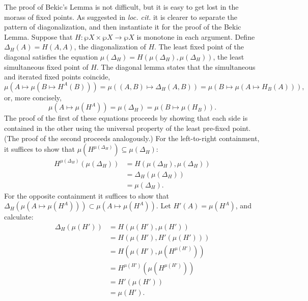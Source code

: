 \documentclass[11pt,twoside]{article}
\begin{document}
The proof of Bekic's Lemma is not difficult, but it is easy to get lost in the morass of
fixed points.  As suggested in \textit{loc. cit.} it is clearer to separate the pattern of
diagonalization, and then instantiate it for the proof of the Bekic Lemma.  Suppose that
$H:\wp{X}\times\wp{X}\to\wp{X}$ is monotone in each argument.  Define
$\Delta_{H}(A)=H(A,A)$, the diagonalization of $H$.  The least fixed point of the diagonal
satisfies the equation $\mu(\Delta_{H})=H(\mu(\Delta_{H}),\mu(\Delta_{H}))$, the least simultaneous fixed point of
$H$.  The diagonal lemma states that the simultaneous and iterated fixed points coincide,
$$\mu(A\mapsto\mu(B\mapsto H^{A}(B)))=\mu((A,B)\mapsto \Delta_{H}(A,B))=\mu(B\mapsto\mu(A\mapsto H_{B}(A))),$$
or, more concisely,
$$\mu(A\mapsto \mu(H^{A}))=\mu(\Delta_{H})=\mu(B\mapsto\mu(H_{B})).$$
The proof of the first of these equations proceeds by showing that each side is contained
in the other using the universal property of the least pre-fixed point.  (The proof of the
second proceeds analogously.)  For the left-to-right containment, it suffices to show that
$\mu(H^{\mu(\Delta_{H})})\subseteq\mu(\Delta_{H})$:
\begin{align*}
  H^{\mu(\Delta_{H})}(\mu(\Delta_{H}))
  & = H(\mu(\Delta_{H}),\mu(\Delta_{H})) \\
  & = \Delta_{H}(\mu(\Delta_{H})) \\
  & = \mu(\Delta_{H}).
\end{align*}
For the opposite containment it suffices to show that
$\Delta_{H}(\mu(A\mapsto\mu(H^{A})))\subset \mu(A\mapsto\mu(H^{A}))$.  Let $H'(A)=\mu(H^{A})$, and calculate:
\begin{align*}
  \Delta_{H}(\mu(H'))
  & = H(\mu(H'),\mu(H')) \\
  & = H(\mu(H'),H'(\mu(H'))) \\
  & = H(\mu(H'),\mu(H^{\mu(H')})) \\
  & = H^{{\mu(H')}}(\mu(H^{\mu(H')})) \\
  & = H'(\mu(H')) \\
  & = \mu(H').
\end{align*}
\end{document}
